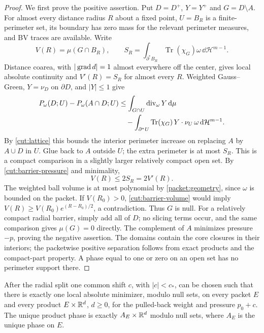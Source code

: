 \begin{proof}
We first prove the positive assertion.  Put $D=D^+$, $Y=Y^+$ and
$G=D\setminus A$.  For almost every distance radius $R$ about a fixed
point, $U=B_R$ is a finite-perimeter set, its boundary has zero mass for
the relevant perimeter measures, and BV traces are available.  Write
\[
 V(R)=\mu(G\cap B_R),\qquad
 S_R=\int_{\partial^*B_R}\operatorname{Tr}(\chi_G)\omega\,
                  \dd\mathcal H^{m-1}.
\]
Distance coarea, with $|\operatorname{grad} d|=1$ almost everywhere off the center,
gives local absolute continuity and $V'(R)=S_R$ for almost every $R$.
Weighted Gauss--Green, $Y=\nu_D$ on $\partial D$, and $|Y|\le1$ give
\begin{align*}
 P_\omega(D;U)-P_\omega(A\cap D;U)
 &\le\int_{G\cap U}\operatorname{div}_\omega Y\,\mathrm d\mu\\
 &\quad-\int_{\partial^*U}
             \operatorname{Tr}(\chi_G)\,Y\cdot\nu_U\,
                         \omega\,\mathrm d\mathcal H^{m-1}.
\end{align*}
By \eqref{cut:lattice} this bounds the interior perimeter increase on
replacing $A$ by $A\cup D$ in $U$.  Glue back to $A$ outside $U$; the
extra perimeter is at most $S_R$.  This is a compact comparison in a
slightly larger relatively compact open set.  By
\eqref{cut:barrier-pressure} and minimality,
\begin{equation}\label{cut:barrier-volume}
                         V(R)\le2S_R=2V'(R).
\end{equation}
The weighted ball volume is at most polynomial by
\cref{packet:geometry}, since $\omega$ is bounded on the packet.
If $V(R_0)>0$, \eqref{cut:barrier-volume} would imply
$V(R)\ge V(R_0)e^{(R-R_0)/2}$, a contradiction.  Thus $G$ is null.
For a relatively compact radial barrier, simply add all of $D$; no
slicing terms occur, and the same comparison gives $\mu(G)=0$ directly.
The complement of $A$ minimizes pressure $-p$, proving the negative
assertion.  The domains contain the core closures in their interiors;
the packetwise positive separation follows from exact products and the
compact-part property.  A phase equal to one or zero on an open set has
no perimeter support there.
\end{proof}

\begin{proposition}
\label{cut:generic-uniqueness}
After the radial split one common shift $c$, with $|c|<c_*$, can be chosen
such that there is exactly one local absolute minimizer, modulo null
sets, on every packet $E$ and every product $E\times\mathbb R^d$, $d\ge0$, for
the pulled-back weight and pressure $p_0+c$.  The unique product phase
is exactly $A_E\times\mathbb R^d$ modulo null sets, where $A_E$ is the unique
phase on $E$.
\end{proposition}

